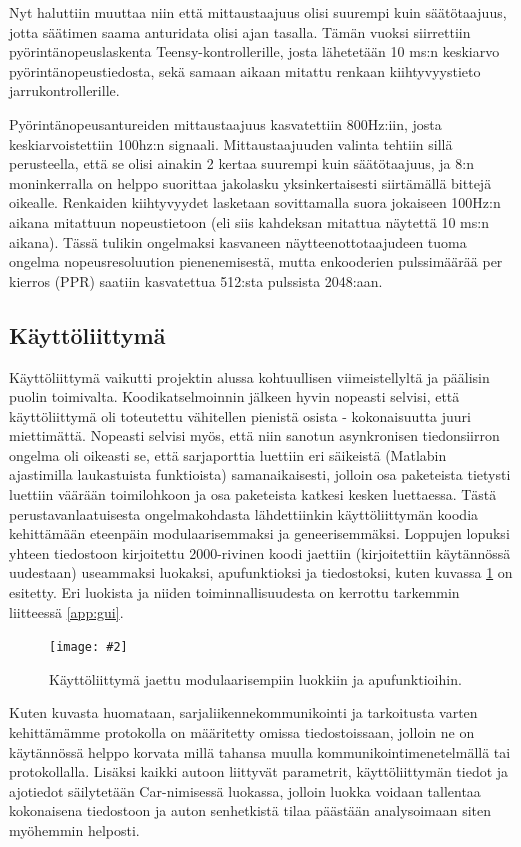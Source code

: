 \documentclass{article}
\newcommand{\kuvaa}[4]{%
	\begin{figure}[h]%
		\centering \texttt{[image: \#2]}%
		\caption{#3 \label{fig:#4}}%
	\end{figure}%
}
\begin{document}
Nyt haluttiin muuttaa niin että mittaustaajuus olisi suurempi kuin säätötaajuus, jotta säätimen saama anturidata olisi ajan tasalla. Tämän vuoksi siirrettiin pyörintänopeuslaskenta Teensy-kontrollerille, josta lähetetään 10 ms:n keskiarvo pyörintänopeustiedosta, sekä samaan aikaan mitattu renkaan kiihtyvyystieto jarrukontrollerille.

Pyörintänopeusantureiden mittaustaajuus kasvatettiin 800Hz:iin, josta keskiarvoistettiin 100hz:n signaali. Mittaustaajuuden valinta tehtiin sillä perusteella, että se olisi ainakin 2 kertaa suurempi kuin säätötaajuus, ja 8:n moninkerralla on helppo suorittaa jakolasku yksinkertaisesti siirtämällä bittejä oikealle. Renkaiden kiihtyvyydet lasketaan sovittamalla suora jokaiseen 100Hz:n aikana mitattuun nopeustietoon (eli siis kahdeksan mitattua näytettä 10 ms:n aikana). Tässä tulikin ongelmaksi kasvaneen näytteenottotaajudeen tuoma ongelma nopeusresoluution pienenemisestä, mutta enkooderien pulssimäärää per kierros (PPR) saatiin kasvatettua 512:sta pulssista 2048:aan.


\subsection{Käyttöliittymä}
Käyttöliittymä vaikutti projektin alussa kohtuullisen viimeistellyltä ja päälisin puolin toimivalta. Koodikatselmoinnin jälkeen hyvin nopeasti selvisi, että käyttöliittymä oli toteutettu vähitellen pienistä osista - kokonaisuutta juuri miettimättä. Nopeasti selvisi myös, että niin sanotun asynkronisen tiedonsiirron ongelma oli oikeasti se, että sarjaporttia luettiin eri säikeistä (Matlabin ajastimilla laukastuista funktioista) samanaikaisesti, jolloin osa paketeista tietysti luettiin väärään toimilohkoon ja osa paketeista katkesi kesken luettaessa. Tästä perustavanlaatuisesta ongelmakohdasta lähdettiinkin käyttöliittymän koodia kehittämään eteenpäin modulaarisemmaksi ja geneerisemmäksi. Loppujen lopuksi yhteen tiedostoon kirjoitettu 2000-rivinen koodi jaettiin (kirjoitettiin käytännössä uudestaan) useammaksi luokaksi, apufunktioksi ja tiedostoksi, kuten kuvassa \ref{fig:guitiedostot} on esitetty. Eri luokista ja niiden toiminnallisuudesta on kerrottu tarkemmin liitteessä \ref{app:gui}.

\kuvaa{0.6}{gui_tiedostolistaus}{Käyttöliittymä jaettu modulaarisempiin luokkiin ja apufunktioihin.}{guitiedostot}

Kuten kuvasta huomataan, sarjaliikennekommunikointi ja tarkoitusta varten kehittämämme protokolla on määritetty omissa tiedostoissaan, jolloin ne on käytännössä helppo korvata millä tahansa muulla kommunikointimenetelmällä tai protokollalla. Lisäksi kaikki autoon liittyvät parametrit, käyttöliittymän tiedot ja ajotiedot säilytetään Car-nimisessä luokassa, jolloin luokka voidaan tallentaa kokonaisena tiedostoon ja auton senhetkistä tilaa päästään analysoimaan siten myöhemmin helposti.
\end{document}
